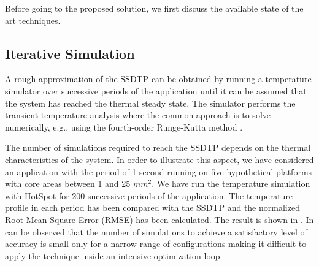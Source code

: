 Before going to the proposed solution, we first discuss the available state of the art techniques.

\subsection{Iterative Simulation} \label{sec:hotspot-iterative-solution}
A rough approximation of the SSDTP can be obtained by running a temperature simulator over successive periods of the application until it can be assumed that the system has reached the thermal steady state. The simulator performs the transient temperature analysis where the common approach is to solve  numerically, e.g., using the fourth-order Runge-Kutta method \cite{press2007}.

The number of simulations required to reach the SSDTP depends on the thermal characteristics of the system. In order to illustrate this aspect, we have considered an application with the period of 1 second running on five hypothetical platforms with core areas between 1 and 25 $mm^2$. We have run the temperature simulation with HotSpot \cite{huang2006} for 200 successive periods of the application. The temperature profile in each period has been compared with the SSDTP and the normalized Root Mean Square Error (RMSE) has been calculated. The result is shown in . In can be observed that the number of simulations to achieve a satisfactory level of accuracy is small only for a narrow range of configurations making it difficult to apply the technique inside an intensive optimization loop.

